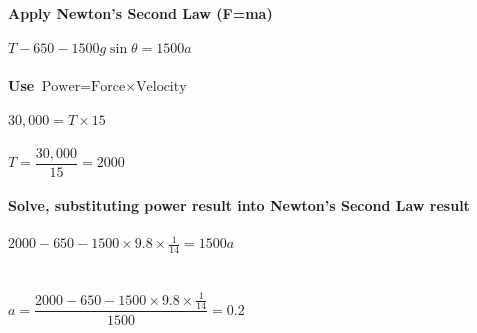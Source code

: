 \documentclass{article}[18pt]
\begin{document}
\\
\\
\textbf{Apply Newton's Second Law (F=ma)}\\
\\
$T-650-1500g\sin\theta=1500a$\\
\\
\textbf{Use $\text{Power=Force}\times\text{Velocity}$}\\
\\
$30,000=T\times15$\\
\\
$T=\dfrac{30,000}{15}=2000$\\
\\
\textbf{Solve, substituting power result into Newton's Second Law result}\\
\\
$2000-650-1500\times9.8\times\frac{1}{14}=1500a$\\
\\
\\
$a=\dfrac{2000-650-1500\times9.8\times\frac{1}{14}}{1500}=0.2$
\end{document}
